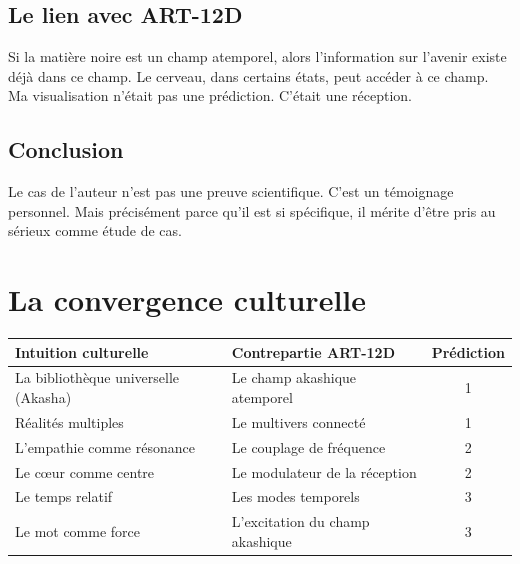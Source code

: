 \subsection{Le lien avec ART-12D}
Si la matière noire est un champ atemporel, alors l'information sur l'avenir existe déjà dans ce champ. Le cerveau, dans certains états, peut accéder à ce champ. Ma visualisation n'était pas une prédiction. C'était une réception.

\subsection{Conclusion}
Le cas de l'auteur n'est pas une preuve scientifique. C'est un témoignage personnel. Mais précisément parce qu'il est si spécifique, il mérite d'être pris au sérieux comme étude de cas.

\section{La convergence culturelle}
\begin{table}[H]
\centering
\begin{tabular}{@{}llc@{}}
\toprule
\textbf{Intuition culturelle} & \textbf{Contrepartie ART-12D} & \textbf{Prédiction} \\ \midrule
La bibliothèque universelle (Akasha) & Le champ akashique atemporel & 1 \\
Réalités multiples & Le multivers connecté & 1 \\
L'empathie comme résonance & Le couplage de fréquence & 2 \\
Le cœur comme centre & Le modulateur de la réception & 2 \\
Le temps relatif & Les modes temporels & 3 \\
Le mot comme force & L'excitation du champ akashique & 3 \\ \bottomrule
\end{tabular}
\end{table}

\newpage
